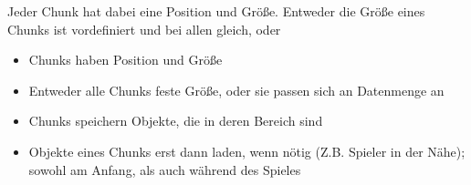 Jeder Chunk hat dabei eine Position und Größe. Entweder die Größe eines Chunks ist vordefiniert und bei allen gleich, oder 

\begin{itemize}
    \item Chunks haben Position und Größe
    \item Entweder alle Chunks feste Größe, oder sie passen sich an Datenmenge an
    \item Chunks speichern Objekte, die in deren Bereich sind
    \item Objekte eines Chunks erst dann laden, wenn nötig (Z.B. Spieler in der Nähe); sowohl am Anfang, als auch während des Spieles
\end{itemize}